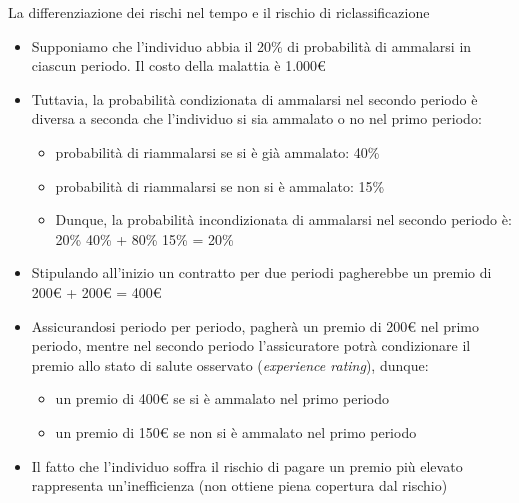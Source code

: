 \documentclass[aspectratio=64,11pt]{beamer}
\begin{document}
\begin{frame}{La differenziazione dei rischi nel tempo e il rischio di riclassificazione}
\small
\begin{itemize}
\item Supponiamo che l'individuo abbia il 20\% di probabilità di ammalarsi in
ciascun periodo. Il costo della malattia è 1.000€
\item Tuttavia, la probabilità \alert{condizionata} di ammalarsi nel secondo periodo è
diversa a seconda che l'individuo si sia ammalato o no nel primo periodo:
\begin{itemize}
\item probabilità di riammalarsi se si è già ammalato: 40\%
\item probabilità di riammalarsi se non si è ammalato: 15\%
\item Dunque, la probabilità incondizionata di ammalarsi nel secondo periodo è:\\[0pt]
20\% \texttimes{} 40\% + 80\% \texttimes{} 15\% = 20\%
\end{itemize}
\item Stipulando all'inizio un contratto per due periodi pagherebbe un premio di
200€ + 200€ = 400€
\item Assicurandosi periodo per periodo, pagherà un premio di 200€ nel primo
periodo, mentre nel secondo periodo l'assicuratore potrà condizionare il
premio allo stato di salute osservato (\emph{experience rating}), dunque:
\begin{itemize}
\item un premio di 400€ se si è ammalato nel primo periodo
\item un premio di 150€ se non si è ammalato nel primo periodo
\end{itemize}
\item Il fatto che l'individuo soffra il rischio di pagare un premio più elevato
rappresenta un'\alert{inefficienza} (non ottiene piena copertura dal rischio)
\end{itemize}
\end{frame}
\end{document}
